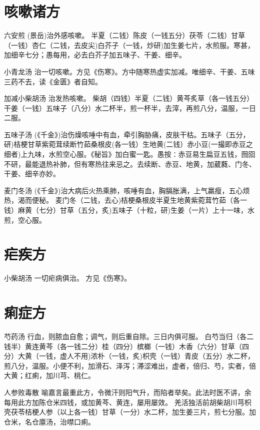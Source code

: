\documentclass[a4paper,12pt,UTF8,twoside]{ctexbook}
\begin{document}
    \chapter{咳嗽诸方}	
    
    六安煎
    (景岳)治外感咳嗽。
    半夏（二钱）陈皮（一钱五分）茯苓（二钱）甘草（一钱）杏仁（二钱，去皮尖)白芥子（一钱，炒研)加生姜七片，水煎服。寒甚，加细辛七分；愚每用，必去白芥子加五味子、干姜、细辛。
    
    小青龙汤
    治一切咳嗽。方见《伤寒》。方中随寒热虚实加减。唯细辛、干姜、五味三药不去，读《金匮》者自知。
    
    加减小柴胡汤
    治发热咳嗽。
    柴胡（四钱）半夏（二钱）黄芩炙草（各一钱五分）干姜（一钱）五味子（八分）水二杯半，煎一杯半，去滓，再煎八分，温服，一日二服。
    
    五味子汤
    (《千金》)治伤燥咳唾中有血，牵引胸胁痛，皮肤干枯。五味子（五分，研)桔梗甘草紫菀茸续断竹茹桑根皮(各一钱）生地黄(二钱）赤小豆(一撮即赤豆之细者)上九味，水煎空心服。《秘旨》加白蜜一匙。愚按∶赤豆易生扁豆五钱，囫囵不研，最能退热补肺，但有寒热往来忌之。去续断、赤豆、地黄，加葳蕤、门冬、干姜、细辛亦妙。
    
    麦门冬汤
    (《千金》)治大病后火热乘肺，咳唾有血，胸膈胀满，上气羸瘦，五心烦热，渴而便秘。
    麦门冬（二钱，去心)桔梗桑根皮半夏生地黄紫菀茸竹茹（各一钱）麻黄（七分）甘草（五分，炙)五味子（十粒，研)生姜（一片）上十一味，水煎，空心服。
    
    \chapter{疟疾方}
    
    小柴胡汤
    一切疟病俱治。
    方见《伤寒》。
    
    \chapter{痢症方}	
    
    芍药汤
    行血，则脓血自愈；调气，则后重自除。三日内俱可服。
    白芍当归（各二钱半）黄连黄芩（各一钱二分）桂（四分）槟榔（一钱）木香（六分）甘草（四分）大黄（一钱，虚人不用)浓朴（一钱，炙)枳壳（一钱）青皮（五分）水二杯，煎八分，温服。小便不利，加滑石、泽泻；滞涩难出，虚者，倍归、芍，实者，倍大黄；红痢，加川芎、桃仁。
    
    人参败毒散
    喻嘉言最重此方，令微汗则阳气升，而陷者举矣。此法时医不讲，余每用此方加陈仓米四钱，或加黄芩、黄连，屡用屡效。
    羌活独活前胡柴胡川芎枳壳茯苓桔梗人参（以上各一钱）甘草（一分）水二杯，加生姜三片，煎七分服。加仓米，名仓廪汤，治噤口痢。
    
\end{document}
